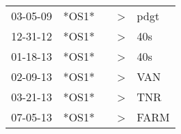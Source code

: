 \begin{supertabular}{p{0.07\textwidth}p{0.06\textwidth}p{0.02\textwidth}p{0.02\textwidth}p{0.06\textwidth}}
 03-05-09\textsuperscript{} &  *OS1* &   &  \textgreater &  pdgt\textsuperscript{} \\
 12-31-12\textsuperscript{} &  *OS1* &   &  \textgreater &   40s\textsuperscript{} \\
 01-18-13\textsuperscript{} &  *OS1* &   &  \textgreater &   40s\textsuperscript{} \\
 02-09-13\textsuperscript{} &  *OS1* &   &  \textgreater &   VAN\textsuperscript{} \\
 03-21-13\textsuperscript{} &  *OS1* &   &  \textgreater &   TNR\textsuperscript{} \\
 07-05-13\textsuperscript{} &  *OS1* &   &  \textgreater &  FARM\textsuperscript{} \\
\end{supertabular}
